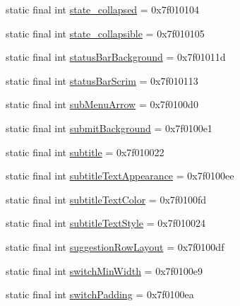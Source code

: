 \begin{CompactItemize}
static final int \hyperlink{classandroid_1_1support_1_1v7_1_1recyclerview_1_1_r_1_1attr_cc0e73ca989d889d204cd23c847591c0}{state\_\-collapsed} = 0x7f010104
\item 
static final int \hyperlink{classandroid_1_1support_1_1v7_1_1recyclerview_1_1_r_1_1attr_955a6e6b1d0d049e6bdf07261cd0baa8}{state\_\-collapsible} = 0x7f010105
\item 
static final int \hyperlink{classandroid_1_1support_1_1v7_1_1recyclerview_1_1_r_1_1attr_963021ba4b2708d0c79a33c89a669b52}{statusBarBackground} = 0x7f01011d
\item 
static final int \hyperlink{classandroid_1_1support_1_1v7_1_1recyclerview_1_1_r_1_1attr_2ebfa9b2582fc7669e07b43ca7f8f7c1}{statusBarScrim} = 0x7f010113
\item 
static final int \hyperlink{classandroid_1_1support_1_1v7_1_1recyclerview_1_1_r_1_1attr_969ec37bdbc88cf6616a03b973c7d2cf}{subMenuArrow} = 0x7f0100d0
\item 
static final int \hyperlink{classandroid_1_1support_1_1v7_1_1recyclerview_1_1_r_1_1attr_2bb926ff90482a0935b5968e81cf6b0e}{submitBackground} = 0x7f0100e1
\item 
static final int \hyperlink{classandroid_1_1support_1_1v7_1_1recyclerview_1_1_r_1_1attr_dd0bd343e5cb7b5fe3216b9973876a01}{subtitle} = 0x7f010022
\item 
static final int \hyperlink{classandroid_1_1support_1_1v7_1_1recyclerview_1_1_r_1_1attr_50f5853ab06d7b11cbd5762a661dfbed}{subtitleTextAppearance} = 0x7f0100ee
\item 
static final int \hyperlink{classandroid_1_1support_1_1v7_1_1recyclerview_1_1_r_1_1attr_0d603e8a1bb930c7640ba351924d5bd3}{subtitleTextColor} = 0x7f0100fd
\item 
static final int \hyperlink{classandroid_1_1support_1_1v7_1_1recyclerview_1_1_r_1_1attr_6fee3464a68c7bde3dc0e6f6346450fe}{subtitleTextStyle} = 0x7f010024
\item 
static final int \hyperlink{classandroid_1_1support_1_1v7_1_1recyclerview_1_1_r_1_1attr_b9f8348d0b2f834bd8ec7c461fc0bc37}{suggestionRowLayout} = 0x7f0100df
\item 
static final int \hyperlink{classandroid_1_1support_1_1v7_1_1recyclerview_1_1_r_1_1attr_80983815734c39a194141f2e668daa2e}{switchMinWidth} = 0x7f0100e9
\item 
static final int \hyperlink{classandroid_1_1support_1_1v7_1_1recyclerview_1_1_r_1_1attr_23674d73174e3f4fb1a79e292dc82aa1}{switchPadding} = 0x7f0100ea
\item 

\end{CompactItemize}

